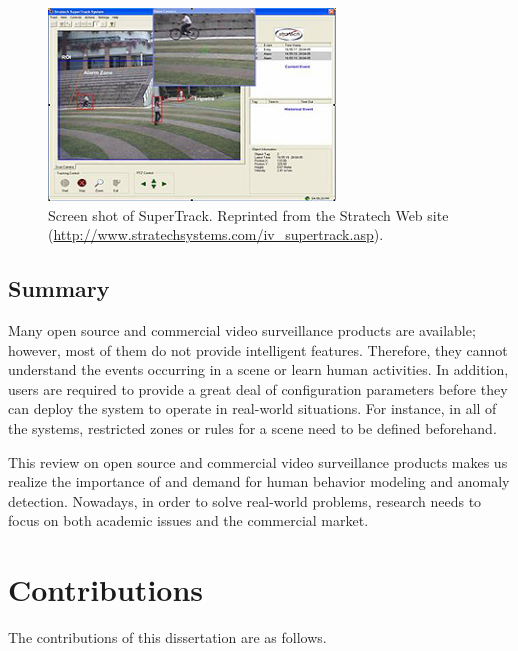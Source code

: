 \begin{figure}[t]
  \begin{center}
    \includegraphics[width=3in]{figures/supertrack.jpg}
    \caption[Screen shot of SuperTrack.]{\small Screen shot of
      SuperTrack. Reprinted from the Stratech Web site
      (\url{http://www.stratechsystems.com/iv_supertrack.asp}).}
    \label{fig:supertrack}
  \end{center}
\end{figure}

\subsection{Summary}

Many open source and commercial video surveillance products are
available; however, most of them do not provide intelligent
features. Therefore, they cannot understand the events occurring in a
scene or learn human activities. In addition, users are required to
provide a great deal of configuration parameters before they can
deploy the system to operate in real-world situations. For instance,
in all of the systems, restricted zones or rules for a scene need to
be defined beforehand.

This review on open source and commercial video surveillance products
makes us realize the importance of and demand for human behavior
modeling and anomaly detection. Nowadays, in order to solve real-world
problems, research needs to focus on both academic issues and the
commercial market.

\section{Contributions}

The contributions of this dissertation are as follows.

